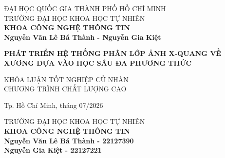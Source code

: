 \begin{titlepage}

\begin{center}
ĐẠI HỌC QUỐC GIA THÀNH PHỐ HỒ CHÍ MINH\\
TRƯỜNG ĐẠI HỌC KHOA HỌC TỰ NHIÊN\\
\textbf{KHOA CÔNG NGHỆ THÔNG TIN}\\[2cm]


{ \Large \bfseries Nguyễn Văn Lê Bá Thành - Nguyễn Gia Kiệt\\[2cm] } 


{ \Large \bfseries PHÁT TRIỂN HỆ THỐNG PHÂN LỚP ẢNH X-QUANG VỀ XƯƠNG DỰA VÀO HỌC SÂU ĐA PHƯƠNG THỨC\\[3cm]} 


\large KHÓA LUẬN TỐT NGHIỆP CỬ NHÂN\\
\large CHƯƠNG TRÌNH CHẤT LƯỢNG CAO\\



\vfill
Tp. Hồ Chí Minh, tháng 07/2026

\end{center}

\pagebreak



\begin{center}

TRƯỜNG ĐẠI HỌC KHOA HỌC TỰ NHIÊN\\
\textbf{KHOA CÔNG NGHỆ THÔNG TIN}\\[2cm]


{\large \bfseries Nguyễn Văn Lê Bá Thành - 22127390\\} 
{\large \bfseries Nguyễn Gia Kiệt - 22127221\\[2cm]}



\end{center}
\end{titlepage}
